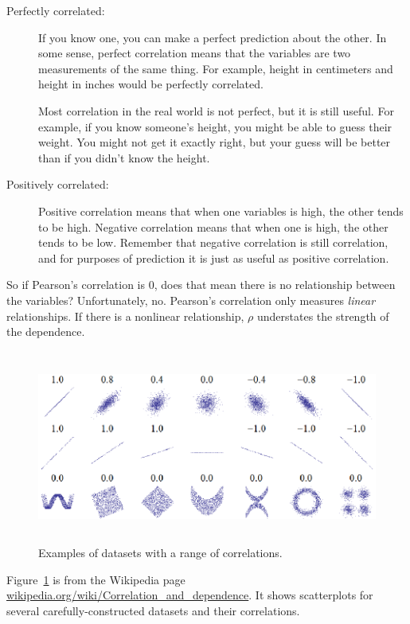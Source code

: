 \documentclass[12pt]{book}
\begin{document}
\begin{description}

\item[Perfectly correlated:] If 
you know one, you can make a perfect prediction about the other.
In some sense, perfect correlation means that the variables are two
measurements of the same thing.  For example, height in centimeters and
height in inches would be perfectly correlated.

Most correlation in the real world is not perfect, but it
is still useful.  For example, if you know someone's height, you might
be able to guess their weight.  You might not get it exactly right, but
your guess will be better than if you didn't know the height.

\item[Positively correlated:] Positive correlation means that when one
  variables is high, the other tends to be high.  Negative correlation
  means that when one is high, the other tends to be low.  Remember that
  negative correlation is still correlation, and for purposes of
  prediction it is just as useful as positive correlation.

\end{description}

So if Pearson's correlation is 0, does that mean there is no
relationship between the variables?  Unfortunately, no.  Pearson's
correlation only measures {\em linear} relationships.  If there is a
nonlinear relationship, $\rho$ understates the strength of the
dependence.

\begin{figure}
\centerline{\includegraphics[height=2.5in]{figs/Correlation_examples.eps}}
\caption{Examples of datasets with a range of correlations.}
\label{corr_examples}
\end{figure}

Figure~\ref{corr_examples} is from the Wikipedia page
\url{wikipedia.org/wiki/Correlation_and_dependence}.  It shows
scatterplots for several carefully-constructed datasets and their
correlations.
\end{document}
